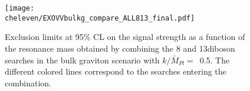 \begin{figure}[!htb]
\centering
\texttt{[image: \\cheleven/EXOVVbulkg\_compare\_ALL813\_final.pdf]}
\caption{
Exclusion limits at 95\% CL on the signal strength as a function of the resonance mass obtained by combining the 8 and 13\TeV diboson searches in the bulk graviton scenario with $k/\bar{M}_{Pl}=$~0.5. The different colored lines correspond to the searches entering the combination.}
\label{fig:bulkgall_138TeV}
\end{figure}
